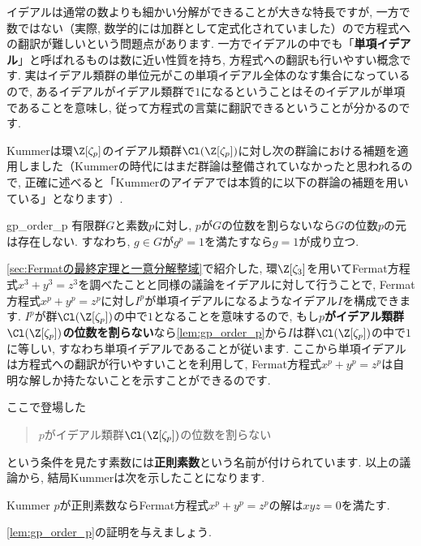 \documentclass[11pt,b5paper,oneside,titlepage,lualatex]{ltjsreport}
\numberwithin{equation}{section} %
\begin{document}
イデアルは通常の数よりも細かい分解ができることが大きな特長ですが, 一方で数ではない（実際, 数学的には加群として定式化されていました）ので方程式への翻訳が難しいという問題点があります. 
一方でイデアルの中でも「\textbf{単項イデアル}」と呼ばれるものは数に近い性質を持ち, 方程式への翻訳も行いやすい概念です. 
実はイデアル類群の単位元がこの単項イデアル全体のなす集合になっているので, あるイデアルがイデアル類群で$ 1 $になるということはそのイデアルが単項であることを意味し, 従って方程式の言葉に翻訳できるということが分かるのです. 

Kummerは環$ \Z[\zeta_p] $のイデアル類群$ \Cl(\Z[\zeta_p]) $に対し次の群論における補題を適用しました（Kummerの時代にはまだ群論は整備されていなかったと思われるので, 正確に述べると「Kummerのアイデアでは本質的に以下の群論の補題を用いている」となります）. 

\begin{lem}{}{gp_order_p}
	有限群$ G $と素数$ p $に対し, $ p $が$ G $の位数を割らないなら$ G $の位数$ p $の元は存在しない. 
	すなわち, $ g \in G $が$ g^p = 1 $を満たすなら$ g = 1 $が成り立つ. 
\end{lem}

\cref{sec:Fermatの最終定理と一意分解整域}で紹介した, 環$ \Z[\zeta_3] $を用いてFermat方程式$ x^3 + y^3 = z^3 $を調べたことと同様の議論をイデアルに対して行うことで, Fermat方程式$ x^p + y^p = z^p $に対し$ I^p $が単項イデアルになるようなイデアル$ I $を構成できます. 
$ I^p $が群$ \Cl(\Z[\zeta_p]) $の中で$ 1 $となることを意味するので, もし\textbf{$ p $がイデアル類群$ \Cl(\Z[\zeta_p]) $の位数を割らない}なら\cref{lem:gp_order_p}から$ I $は群$ \Cl(\Z[\zeta_p]) $の中で$ 1 $に等しい, すなわち単項イデアルであることが従います. 
ここから単項イデアルは方程式への翻訳が行いやすいことを利用して, Fermat方程式$ x^p + y^p = z^p $は自明な解しか持たないことを示すことができるのです. 

ここで登場した
\begin{quote}
	\centering
	$ p $がイデアル類群$ \Cl(\Z[\zeta_p]) $の位数を割らない
\end{quote}
という条件を見たす素数には\textbf{正則素数}という名前が付けられています. 
以上の議論から, 結局Kummerは次を示したことになります. 

\begin{thm}{Kummer}{}
	$ p $が正則素数ならFermat方程式$ x^p + y^p = z^p $の解は$ xyz = 0 $を満たす. 
\end{thm}


\begin{exc}{}{}
	\cref{lem:gp_order_p}の証明を与えましょう. 
\end{exc}
\end{document}

